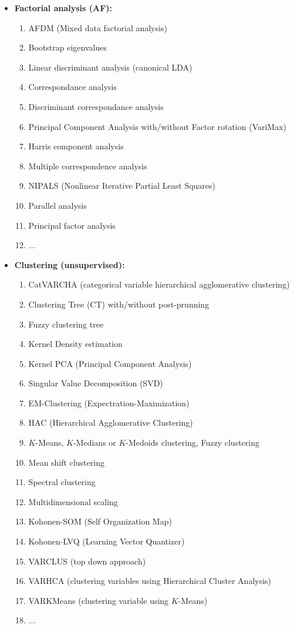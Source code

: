 \begin{itemize}
		\item \textbf{Factorial analysis (AF):}
		\begin{enumerate}
			\item AFDM (Mixed data  factorial analysis)
			\item Bootstrap eigenvalues
			\item Linear discriminant analysis (canonical LDA)
			\item Correspondance analysis
			\item Discriminant correspondance analysis
			\item Principal Component Analysis with/without Factor rotation (VariMax)
			\item Harris component analysis
			\item Multiple correspondence analysis
			\item NIPALS (Nonlinear Iterative Partial Least Squares)
			\item Parallel analysis
			\item Principal factor analysis
			\item ...
		\end{enumerate}
		
		\item \textbf{Clustering (unsupervised):}
		\begin{enumerate}
			\item CatVARCHA (categorical variable hierarchical agglomerative clustering)
			\item Clustering Tree (CT) with/without post-prunning
			\item Fuzzy clustering tree
			\item Kernel Density estimation
			\item Kernel PCA (Principal Component Analysis)
			\item Singular Value Decomposition (SVD)
			\item EM-Clustering (Expectration-Maximization)
			\item HAC (Hierarchical Agglomerative Clustering)
			\item $K$-Means, $K$-Medians or $K$-Medoids clustering, Fuzzy clustering
			\item Mean shift clustering
			\item Spectral clustering
			\item Multidimensional scaling
			\item Kohonen-SOM (Self Organization Map)
			\item Kohonen-LVQ (Learning Vector Quantizer)
			\item VARCLUS (top down approach)
			\item VARHCA (clustering variables using Hierarchical Cluster Analysis)
			\item VARKMeans (clustering variable using $K$-Means)
			\item ...
		\end{enumerate}
		

\end{itemize}
